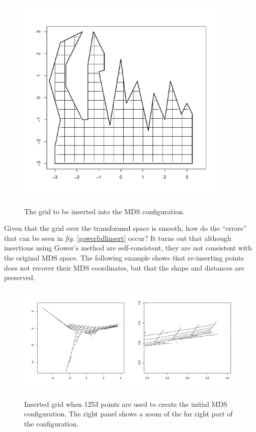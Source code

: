 \documentclass[a4paper,10pt]{article}
\newcommand{\fig}[1]{\emph{fig.} \ref{#1}}
\begin{document}
\begin{figure}
\centering
\includegraphics[width=4in]{figs/wt2-grid-orig.pdf} \\
\caption{The grid to be inserted into the MDS configuration.}
\label{wt2-grid-orig}
\end{figure}

Given that the grid over the transformed space is smooth, how do the ``errors'' that can be seen in \fig{gowerfullinsert} occur? It turns out that although insertions using Gower's method are self-consistent, they are not consistent with the original MDS space. The following example shows that re-inserting points does not recover their MDS coordinates, but that the shape and distances are preserved.

\begin{figure}
\centering
\includegraphics[width=5in]{figs/wt2-grid-full.pdf} \\
\caption{Inserted grid when 1253 points are used to create the initial MDS configuration. The right panel shows a zoom of the far right part of the configuration.}
\label{wt2-grid-full}
\end{figure}
\end{document}
